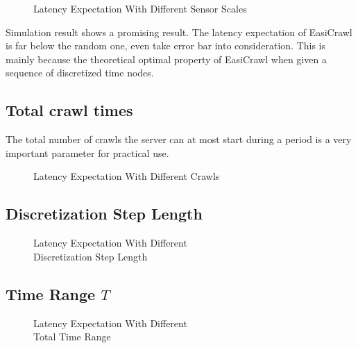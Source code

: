 \documentclass[conference]{IEEEtran}
\begin{document}
\begin{figure}
	\centering
	
	\captionsetup{justification=centering}
	\caption{Latency Expectation With Different Sensor Scales}
	\label{fig:test1_sensorscale}
\end{figure}

Simulation result shows a promising result. The latency expectation of EasiCrawl is far below the random one, even take error bar into consideration. This is mainly because the theoretical optimal property of EasiCrawl when given a sequence of discretized time nodes. 

\subsection{Total crawl times}

The total number of crawls the server can at most start during a period is a very important parameter for practical use. 


\begin{figure}
	\centering
	
	\captionsetup{justification=centering}
	\caption{Latency Expectation With Different Crawls}
	\label{fig:test2_totalcrawl}
\end{figure}

\subsection{Discretization Step Length}

\begin{figure}
	\centering
	
	\captionsetup{justification=centering}
	\caption{Latency Expectation With Different 
		\\Discretization Step Length}
	\label{fig:test3_discretestep}
\end{figure}

\subsection{Time Range $T$}

\begin{figure}
	\centering
	
	\captionsetup{justification=centering}
	\caption{Latency Expectation With Different 
		\\Total Time Range}
	\label{fig:test4_timerange}
\end{figure}
\end{document}
